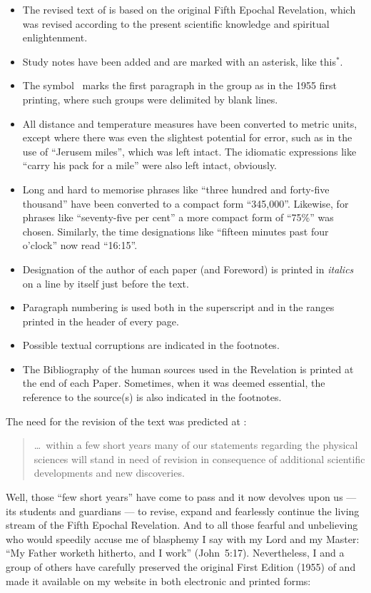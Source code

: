 \begin{itemize}
\item The revised text of  is based on the original Fifth Epochal Revelation,
which was revised according to the present scientific knowledge and spiritual enlightenment.
\item Study notes have been added and are marked with an asterisk, like this$^*$.
\item The symbol \pc\ marks the first paragraph in the group as in the 1955 first printing, where such groups were delimited by blank lines.
\item All distance and temperature measures have been converted to metric units, except where there was even the slightest potential for error, such as in the use of ``Jerusem miles'', which was left intact. The idiomatic expressions like ``carry his pack for a mile'' were also left intact, obviously.
\item Long and hard to memorise phrases like ``three hundred and forty\hyp{}five thousand'' have been converted to a compact form ``345,000''. Likewise, for phrases like ``seventy\hyp{}five per cent'' a more compact form of ``75\%'' was chosen. Similarly, the time designations like ``fifteen minutes past four o’clock'' now read ``16:15''.
\item Designation of the author of each paper (and Foreword) is printed in \textit{italics} on a line by itself just before the text.
\item Paragraph numbering is used both in the superscript and in the ranges printed in the head\-er of every page.
\item Possible textual corruptions are indicated in the footnotes.
\item The Bibliography of the human sources used in the Revelation is printed at the end of each Paper.
      Sometimes, when it was deemed essential, the reference to the source(s) is also indicated in the footnotes.
\end{itemize}

The need for the revision of the text was predicted at :

\begin{quote}
\ldots\ within a few short years many of our statements regarding the physical sciences will stand in need of revision in consequence of additional scientific developments and new discoveries.
\end{quote}

Well, those ``few short years'' have come to pass and it now devolves upon us --- its students and guardians --- to revise,
expand and fearlessly continue the living stream of the Fifth Epochal Revelation.
And to all those fearful and unbelieving who would speedily accuse me of blasphemy I say with my Lord and my Master:
``My Father worketh hitherto, and I work'' (John~5:17).
Nevertheless, I and a group of others have carefully preserved the original First Edition (1955) of 
and made it available on my website in both electronic and printed forms:

